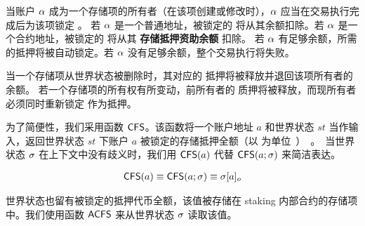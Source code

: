 当账户 $\mathbf{\alpha}$ 成为一个存储项的所有者（在该项创建或修改时），$\mathbf{\alpha}$ 应当在交易执行完成后为该项锁定 \sunitprice。
若 $\mathbf{\alpha}$ 是一个普通地址，被锁定的 \sunitprice 将从其余额扣除。若 $\mathbf{\alpha}$ 是一个合约地址，被锁定的 \sunitprice 将从其 \textbf{存储抵押资助余额} 扣除。
若 $\mathbf{\alpha}$ 有足够余额，所需的抵押将被自动锁定。若 $\mathbf{\alpha}$ 没有足够余额，整个交易执行将失败。

当一个存储项从世界状态被删除时，其对应的 \sunitprice 抵押将被释放并退回该项所有者的余额。
若一个存储项的所有权有所变动，前所有者的 \sunitprice 质押将被释放，而现所有者必须同时重新锁定 \sunitprice 作为抵押。

为了简便性，我们采用函数 $\mathsf{CFS}$。该函数将一个账户地址 $a$ 和世界状态 $st$ 当作输入，返回世界状态 $st$ 下账户 $a$ 被锁定的存储抵押全额（以 \unit 为单位）。
当世界状态 $\mathbf{\sigma}$ 在上下文中没有歧义时，我们用 $\mathsf{CFS}(a)$ 代替 $\mathsf{CFS}(a;\mathbf{\sigma})$ 来简洁表达。

\begin{align}
	\mathsf{CFS}(a) \equiv \mathsf{CFS}(a;\mathbf{\sigma}) \equiv \mathbf{\sigma}[a]_o
\end{align}

世界状态也留有被锁定的抵押代币全额，该值被存储在 staking 内部合约的存储项中。我们使用函数 ${\sf ACFS}$ 来从世界状态 $\mathbf{\sigma}$ 读取该值。

